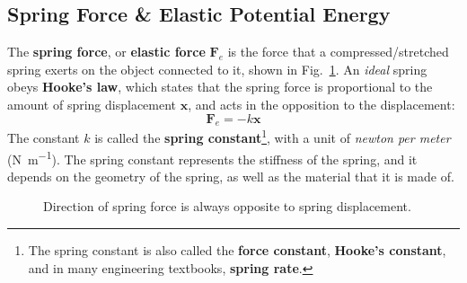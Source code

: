 \subsection{Spring Force \& Elastic Potential Energy}
The \textbf{spring force}, or \textbf{elastic force} $\bm F_e$ is the force
that a compressed/stretched spring exerts on the object connected to it, shown
in Fig.~\ref{hooke1}. An \emph{ideal} spring obeys \textbf{Hooke's law}, which
states that the spring force is proportional to the amount of spring
displacement $\bm x$, and acts in the opposition to the displacement:
\begin{equation}
  \boxed{
    \bm F_e=-k\bm x
  }
\end{equation}
The constant $k$ is called the \textbf{spring constant}\footnote{The spring
constant is also called the \textbf{force constant}, \textbf{Hooke's constant},
and in many engineering textbooks, \textbf{spring rate}.}, with a unit of
\emph{newton per meter} (\si{\newton\per\metre}). The spring constant
represents the stiffness of the spring, and it depends on the geometry of the
spring, as well as the material that it is made of.
\begin{figure}[ht]
  \centering
  \hspace{.2in}
  \caption{Direction of spring force is always opposite to spring
    displacement.}
  \label{hooke1}
\end{figure}

